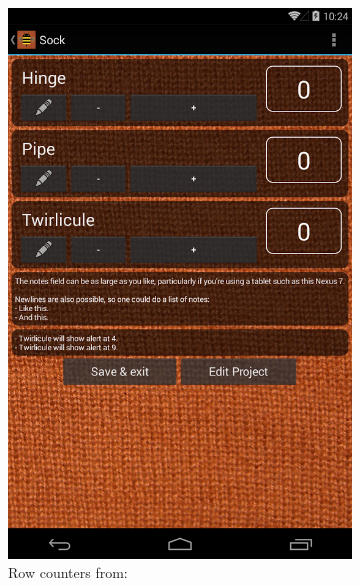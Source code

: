 \begin{figure}[H]
  \centering
    \begin{subfigure}[b]{0.33\textwidth}
      \centering
        \includegraphics[width=0.95\linewidth]{images/image01.png}
        \caption[Row counters ]{Row counters from: \protect\cite{beecounter_row_counters}}
    \end{subfigure}
    \begin{subfigure}[b]{0.33\textwidth}
      \centering

\end{subfigure}
\end{figure}
